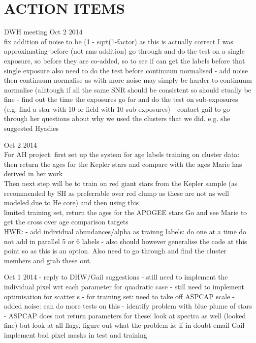 \documentclass[12pt, preprint]{aastex}
\begin{document}
\section{ACTION ITEMS}
DWH meeting Oct 2 2014\\
fix addition of noise to be (1 - sqrt(1-factor) as this is actually correct I was approximating before (not rms addition)
go through and do the test on a single exposure, so before they are co-added, so to see if can get the labels before that single exposure
also need to do the test before continuum normalised - add noise then continuum normalise as with more noise may simply be harder to continuum normalise (alhtough if all the same SNR should be
consistent so should ctually be fine - 
find out the time the exposures go for and do the test on sub-exposures (e.g. find a star with 10 or field with 10 sub-exposures)
- contact gail to go through her questions about why we used the clusters that we did.  e.g. she suggested Hyadies 


Oct 2 2014\\
For AH project: first set up the system for age labels training on cluster data: then return the ages for the Kepler stars and compare with the ages Marie has derived in her work\\
Then next step will be to train on red giant stars from the Kepler sample (as recommended by SH as preferrable over red clump as these are not as well modeled due to He core) and then using this\\
limited training set, return the ages for the APOGEE stars
Go and see Marie to get the cross over age comparison targets \\

HWR:
- add individual abundances/alpha as trainng labels: do one at a time do not add in parallel 5 or 6 labels - also should however generalise the code at this point so as this is an option. Also need to
go through and find the cluster members and grab these out. 

Oct 1 2014
- reply to DHW/Gail suggestions
- still need to implement the individual pixel wrt each parameter for quadratic case
- still need to implement optimisation for scatter s 
- for training set: need to take off ASPCAP scale 
- added noise: can do more tests on this 
- identify problem with blue plume of stars - ASPCAP does not return parameters for these: look at spectra as well (looked fine) but look at all flags, figure out what the problem is: if in doubt
email Gail 
- implement bad pixel masks in test and training 
\end{document}
